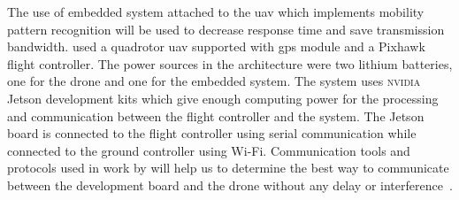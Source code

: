\documentclass[../main.tex]{subfiles}
\begin{document}
The use of embedded system attached to the \gls{uav} which implements mobility pattern recognition will be used to decrease response time and save transmission bandwidth. 
\citeauthor{Zhao18} used a quadrotor \gls{uav} supported with \gls{gps} module and a 
Pixhawk flight controller. The power sources in the architecture were two lithium batteries, 
one for the drone and one for the embedded system. The system uses \textsc{nvidia} Jetson development
kits which give enough computing power for the processing and communication between the flight 
controller and the system. The Jetson board is connected to the flight controller using serial 
communication while connected to the ground controller using Wi-Fi. Communication tools and protocols used in work by \citeauthor{Zhao18} will help us to determine the best way to communicate between the development board and the drone without any delay or interference~\cite{Zhao18}. 

\end{document}
